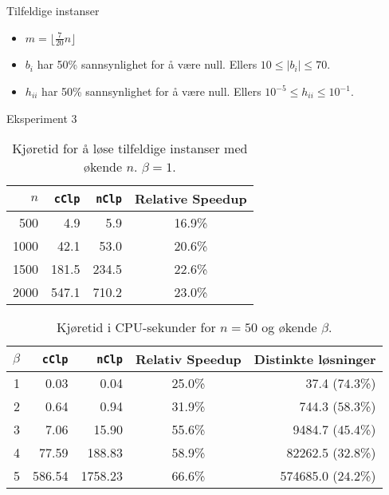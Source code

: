 \documentclass{beamer}
\begin{document}
\begin{frame}{Tilfeldige instanser}
\begin{itemize}
\item $m = \lfloor \frac{7}{20}n \rfloor$
\item $b_i$ har 50\% sannsynlighet for å være null. Ellers $10 \leq | b_i | \leq 70$.
\item $h_{ii}$ har 50\% sannsynlighet for å være null. Ellers $10^{-5} \leq h_{ii} \leq 10^{-1}$.
\end{itemize}
\end{frame}



\begin{frame}{Eksperiment 3}
\begin{table}[ht!]
    \centering
    \caption{Kjøretid for å løse tilfeldige instanser med økende $n$. $\beta = 1$.}
    \label{table:expfour}
\begin{tabular}{rrrc}
    $n$ & \texttt{cClp}  & \texttt{nClp}  & Relative Speedup \\ \hline
    500 & 4.9   & 5.9   & 16.9\% \\
   1000 & 42.1  & 53.0  & 20.6\% \\
   1500 & 181.5 & 234.5 & 22.6\% \\
   2000 & 547.1 & 710.2 & 23.0\%
\end{tabular}
\end{table}
\end{frame}



\begin{frame}
\begin{table}[ht!]
\centering
\caption{Kjøretid i CPU-sekunder for $n = 50$ og økende $\beta$.}
\begin{tabular}{rrrcr}
      $\beta$ & \texttt{cClp} & \texttt{nClp} & Relativ Speedup & Distinkte løsninger\\ \hline
       1  & 0.03 & 0.04 & 25.0\% & 37.4 ($74.3$\%) \\
       2  & 0.64 & 0.94 & 31.9\% & 744.3 ($58.3$\%) \\
       3  & 7.06 & 15.90 & 55.6\% & 9484.7 ($45.4$\%) \\
       4  & 77.59 & 188.83 & 58.9\% & 82262.5 ($32.8$\%) \\
       5  & 586.54 & 1758.23 & 66.6\% & 574685.0 ($24.2$\%) \\
\end{tabular}
\label{table:exptwo}
\end{table}
\end{frame}



\begin{frame}

\end{frame}
\end{document}
